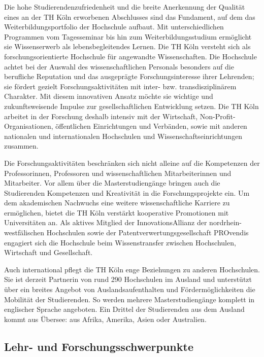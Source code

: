 Die hohe Studierendenzufriedenheit und die breite Anerkennung der
Qualität eines an der TH Köln erworbenen Abschlusses sind das Fundament,
auf dem das Weiterbildungsportfolio der Hochschule aufbaut. Mit
unterschiedlichen Programmen vom Tagesseminar bis hin zum
Weiterbildungsstudium ermöglicht sie Wissenserwerb als
lebensbegleitendes Lernen. Die TH Köln versteht sich als
forschungsorientierte Hochschule für angewandte Wissenschaften. Die
Hochschule achtet bei der Auswahl des wissenschaftlichen Personals
besonders auf die berufliche Reputation und das ausgeprägte
Forschungsinteresse ihrer Lehrenden; sie fördert gezielt
Forschungsaktivitäten mit inter- bzw. transdisziplinärem Charakter. Mit
diesem innovativen Ansatz möchte sie wichtige und zukunftsweisende
Impulse zur gesellschaftlichen Entwicklung setzen. Die TH Köln arbeitet
in der Forschung deshalb intensiv mit der Wirtschaft,
Non-Profit-Organisationen, öffentlichen Einrichtungen und Verbänden,
sowie mit anderen nationalen und internationalen Hochschulen und
Wissenschaftseinrichtungen zusammen.

Die Forschungsaktivitäten beschränken sich nicht alleine auf die
Kompetenzen der Professorinnen, Professoren und wissenschaftlichen
Mitarbeiterinnen und Mitarbeiter. Vor allem über die Masterstudiengänge
bringen auch die Studierenden Kompetenzen und Kreativität in die
Forschungsprojekte ein. Um dem akademischen Nachwuchs eine weitere
wissenschaftliche Karriere zu ermöglichen, bietet die TH Köln verstärkt
kooperative Promotionen mit Universitäten an. Als aktives Mitglied der
InnovationsAllianz der nordrhein-westfälischen Hochschulen sowie der
Patentverwertungsgesellschaft PROvendis engagiert sich die Hochschule
beim Wissenstransfer zwischen Hochschulen, Wirtschaft und Gesellschaft.

Auch international pflegt die TH Köln enge Beziehungen zu anderen
Hochschulen. Sie ist derzeit Partnerin von rund 290 Hochschulen im
Ausland und unterstützt über ein breites Angebot von
Auslandsaufenthalten und Fördermöglichkeiten die Mobilität der
Studierenden. So werden mehrere Masterstudiengänge komplett in
englischer Sprache angeboten. Ein Drittel der Studierenden aus dem
Ausland kommt aus Übersee: aus Afrika, Amerika, Asien oder Australien.

\subsection{Lehr- und
Forschungsschwerpunkte}\label{lehr--und-forschungsschwerpunkte}


